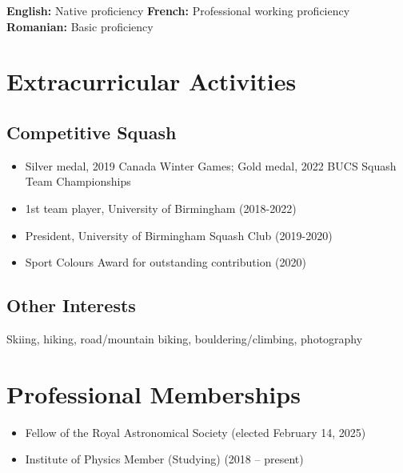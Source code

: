 \documentclass[11pt,a4paper]{article}
\begin{document}
\textbf{English:} Native proficiency \quad \textbf{French:} Professional working proficiency \quad \textbf{Romanian:} Basic proficiency

\section*{Extracurricular Activities}

\subsection*{Competitive Squash}
\begin{itemize}
    \item Silver medal, 2019 Canada Winter Games; Gold medal, 2022 BUCS Squash Team Championships
    \item 1st team player, University of Birmingham (2018-2022)
    \item President, University of Birmingham Squash Club (2019-2020)
    \item Sport Colours Award for outstanding contribution (2020)
\end{itemize}

\subsection*{Other Interests}
Skiing, hiking, road/mountain biking, bouldering/climbing, photography

\section*{Professional Memberships}

\begin{itemize}
    \item Fellow of the Royal Astronomical Society (elected February 14, 2025)
    \item Institute of Physics Member (Studying) (2018 -- present)
\end{itemize}
\end{document}
